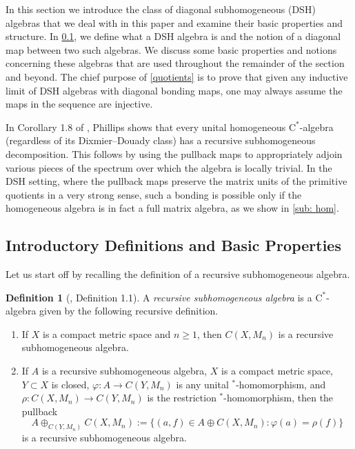 \documentclass[12pt]{amsart}
\numberwithin{equation}{section}
\theoremstyle{definition}
\newtheorem{definition}[theorem]{Definition}
\theoremstyle{remark}
\begin{document}
In this section we introduce the class of diagonal subhomogeneous (DSH) algebras that we deal with in this paper and examine their basic properties and structure. In \cref{sub: intro}, we define what a DSH algebra is and the notion of a diagonal map between two such algebras. We discuss some basic properties and notions concerning these algebras that are used throughout the remainder of the section and beyond. The chief purpose of \cref{quotients} is to prove that given any inductive limit of DSH algebras with diagonal bonding maps, one may always assume the maps in the sequence are injective. 

In Corollary 1.8 of \cite{phil}, Phillips shows that every unital homogeneous $\mathrm{C}^{*}$-algebra (regardless of its Dixmier--Douady class) has a recursive subhomogeneous decomposition. This follows by using the pullback maps to appropriately adjoin various pieces of the spectrum over which the algebra is locally trivial. In the DSH setting, where the pullback maps preserve the matrix units of the primitive quotients in a very strong sense, such a bonding is possible only if the homogeneous algebra is in fact a full matrix algebra, as we show in \cref{sub: hom}.

\subsection{Introductory Definitions and Basic Properties}
\label{sub: intro}
Let us start off by recalling the definition of a recursive subhomogeneous algebra.

\begin{definition}[\cite{phil}, Definition 1.1]
	A \textit{recursive subhomogeneous algebra} is a $\mathrm{C}^*$-algebra given by the following recursive definition.
	\begin{enumerate}
		\item If $X$ is a compact metric space and $n\geq 1$, then $C(X,M_{n})$ is a recursive subhomogeneous algebra. 
		\item If $A$ is a recursive subhomogeneous algebra, $X$ is a compact metric space, $Y\subset X$ is closed, $\varphi\colon A\to C(Y, M_{n})$ is any unital $^*$-homomorphism, and $\rho\colon C(X,M_{n})\to C(Y, M_{n})$ is the restriction $^*$-homomorphism, then the pullback
		$$
		A\oplus_{C(Y, M_{n})}C(X,M_{n}):=\{(a,f)\in A\oplus C(X,M_{n}):\varphi(a)=\rho(f)\}
		$$ 
		is a recursive subhomogeneous algebra. 
	\end{enumerate}
\end{definition}
\end{document}
